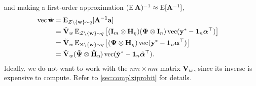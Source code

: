 and making a first-order approximation $(\E \bA )^{-1} \approx \E [\bA^{-1}]$\footnotemark,
\begin{align*}
  \vecc \wtilde 
  &= \E_{\cZ\backslash\{\bw \}\sim q} [\bA^{-1}\ba] \\
  &= \tilde\bV_w \E_{\cZ\backslash\{\bw \}\sim q} \big[(\bI_m \otimes \bH_\eta) (\bPsi \otimes \bI_n) \vecc(\by^* - \bone_n\balpha^\top)  \big] \\
  &= \tilde\bV_w \E_{\cZ\backslash\{\bw \}\sim q} \big[(\bPsi \otimes \bH_\eta) \vecc(\by^* - \bone_n\balpha^\top)  \big] \\
  &= \tilde\bV_w (\tilde\bPsi \otimes \tilde\bH_\eta) \vecc(\tilde\by^* - \bone_n\tilde\balpha^\top).
\end{align*}
Ideally, we do not want to work with the $nm \times nm$ matrix $\bV_w$, since its inverse is expensive to compute.
Refer to \cref{sec:complxiprobit} for details.


